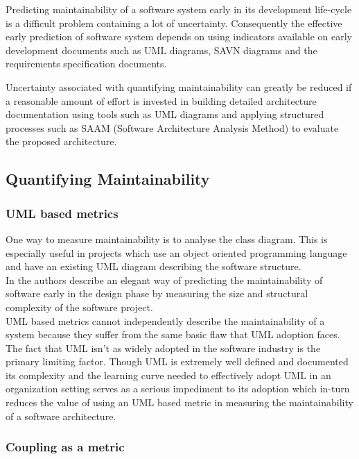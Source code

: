 \documentclass[15pt]{article}
\begin{document}
Predicting maintainability of a software system early in its development life-cycle is a difficult problem containing a lot of uncertainty. Consequently the effective early prediction of software system depends on 	using indicators available on early development documents such as UML diagrams, SAVN diagrams and the requirements specification documents. 

Uncertainty associated with quantifying maintainability can greatly be reduced if a reasonable amount of effort is invested in building detailed architecture documentation using tools such as UML diagrams and applying structured processes such as SAAM (Software Architecture Analysis Method) to evaluate the proposed architecture. 

\subsection{Quantifying Maintainability}
\subsubsection{UML based metrics}
One way to measure maintainability is to analyse the class diagram. This is especially useful in projects which use an object oriented programming language and have an existing UML diagram describing the software structure. \\

In \cite{genero_building_2007} the authors describe an elegant way of predicting the maintainability of software early in the design phase by measuring the size and structural complexity of the software project. \\

UML based metrics cannot independently describe the maintainability of a system because they suffer from the same basic flaw that UML adoption faces. The fact that UML isn't as widely adopted in the software industry is the primary limiting factor. Though UML is extremely well defined and documented its complexity and the learning curve needed to effectively adopt UML in an organization setting serves as a serious impediment to its adoption which in-turn reduces the value of using an UML based metric in measuring the maintainability of a software architecture.

\subsubsection{Coupling as a metric}
\end{document}
